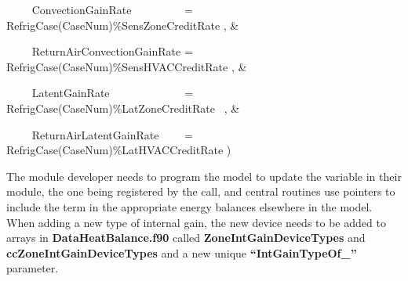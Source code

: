 ~~~~ ConvectionGainRate~~~~~~~~~ = RefrigCase(CaseNum)\%SensZoneCreditRate , \&

~~~~ ReturnAirConvectionGainRate = RefrigCase(CaseNum)\%SensHVACCreditRate , \&

~~~~ LatentGainRate~~~~~~~~~~~~~ = RefrigCase(CaseNum)\%LatZoneCreditRate~ , \&

~~~~ ReturnAirLatentGainRate~~~~ = RefrigCase(CaseNum)\%LatHVACCreditRate )

The module developer needs to program the model to update the variable in their module, the one being registered by the call, and central routines use pointers to include the term in the appropriate energy balances elsewhere in the model.~ When adding a new type of internal gain, the new device needs to be added to arrays in \textbf{DataHeatBalance.f90} called \textbf{ZoneIntGainDeviceTypes} and \textbf{ccZoneIntGainDeviceTypes} and a new unique \textbf{``IntGainTypeOf\_''} parameter.
